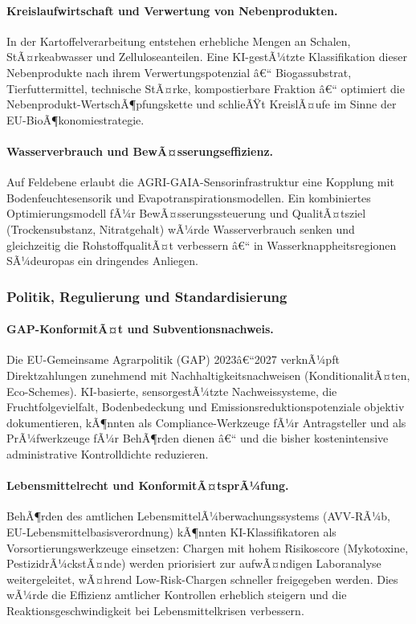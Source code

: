 ﻿\documentclass[12pt,a4paper]{article}
\theoremstyle{plain}
\theoremstyle{definition}
\begin{document}
	\paragraph{Kreislaufwirtschaft und Verwertung von Nebenprodukten.}
	In der Kartoffelverarbeitung entstehen erhebliche Mengen an Schalen,
	StÃ¤rkeabwasser und Zelluloseanteilen. Eine KI-gestÃ¼tzte Klassifikation
	dieser Nebenprodukte nach ihrem Verwertungspotenzial â€“ Biogassubstrat,
	Tierfuttermittel, technische StÃ¤rke, kompostierbare Fraktion â€“
	optimiert die Nebenprodukt-WertschÃ¶pfungskette und schlieÃŸt
	KreislÃ¤ufe im Sinne der EU-BioÃ¶konomiestrategie.

	\paragraph{Wasserverbrauch und BewÃ¤sserungseffizienz.}
	Auf Feldebene erlaubt die AGRI-GAIA-Sensorinfrastruktur eine Kopplung
	mit Bodenfeuchtesensorik und Evapotranspira\-tions\-modellen. Ein
	kombiniertes Optimierungsmodell fÃ¼r BewÃ¤sserungssteuerung und
	QualitÃ¤tsziel (Trockensubstanz, Nitratgehalt) wÃ¼rde Wasserverbrauch
	senken und gleichzeitig die RohstoffqualitÃ¤t verbessern â€“ in
	Wasserknappheitsregionen SÃ¼deuropas ein dringendes Anliegen.

	\subsubsection{Politik, Regulierung und Standardisierung}

	\paragraph{GAP-KonformitÃ¤t und Subventionsnachweis.}
	Die EU-Gemeinsame Agrarpolitik (GAP) 2023â€“2027 verknÃ¼pft Direktzahlungen
	zunehmend mit Nachhaltigkeitsnachweisen (Konditionali\-tÃ¤ten, Eco-Schemes).
	KI-basierte, sensorgestÃ¼tzte Nachweissysteme, die Fruchtfolgevielfalt,
	Bodenbedeckung und Emissionsreduktionspotenziale objektiv dokumentieren,
	kÃ¶nnten als Compliance-Werkzeuge fÃ¼r Antragsteller und als
	PrÃ¼fwerkzeuge fÃ¼r BehÃ¶rden dienen â€“ und die bisher kostenintensive
	administrative Kontrolldichte reduzieren.

	\paragraph{Lebensmittelrecht und KonformitÃ¤tsprÃ¼fung.}
	BehÃ¶rden des amtlichen LebensmittelÃ¼berwachungssystems (AVV-RÃ¼b,
	EU-Lebensmittelbasisverordnung) kÃ¶nnten KI-Klassifikatoren als
	Vorsortierungswerkzeuge einsetzen: Chargen mit hohem Risikoscore
	(Mykotoxine, PestizidrÃ¼ckstÃ¤nde) werden priorisiert zur aufwÃ¤ndigen
	Laboranalyse weitergeleitet, wÃ¤hrend Low-Risk-Chargen schneller
	freigegeben werden. Dies wÃ¼rde die Effizienz amtlicher Kontrollen
	erheblich steigern und die Reaktionsgeschwindigkeit bei
	Lebensmittelkrisen verbessern.
\end{document}
